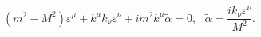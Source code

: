\begin{equation}
(m^2 - M^2) \varepsilon^\mu + k^\mu  k_\nu \varepsilon^\nu + im^2  k^\mu \tilde{\alpha}  = 0, ~~~ \tilde{\alpha} = \frac{ik_\nu \varepsilon^\nu}{M^2}.
\label{58}
\end{equation}

